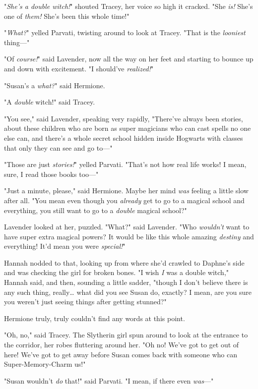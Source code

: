 "\emph{She's a double witch!}" shouted Tracey, her voice so high it cracked. 
"She\emph{ is!} She's one of \emph{them!} She's been this whole time!"

"\emph{What?}" yelled Parvati, twisting around to look at Tracey. "That is the 
\emph{looniest} thing---"

"Of \emph{course!}" said Lavender, now all the way on her feet and starting to 
bounce up and down with excitement. "I should've\emph{ realized!}"

"Susan's a \emph{what?}" said Hermione.

"A \emph{double} witch!" said Tracey.

"You see," said Lavender, speaking very rapidly, "There've always been stories, 
about these children who are born as super magicians who can cast spells no one 
else can, and there's a whole secret school hidden inside Hogwarts with classes 
that only they can see and go to---"

"Those are just \emph{stories!}" yelled Parvati. "That's not how real life 
works! I mean, sure, I read those books too---"

"Just a minute, please," said Hermione. Maybe her mind \emph{was} feeling a 
little slow after all. "You mean even though you \emph{already} get to go to a 
magical school and everything, you still want to go to a \emph{double} magical 
school?"

Lavender looked at her, puzzled. "What?" said Lavender. "Who \emph{wouldn't} 
want to have super extra magical powers? It would be like this whole amazing 
\emph{destiny} and everything! It'd mean you were \emph{special!}"

Hannah nodded to that, looking up from where she'd crawled to Daphne's side and 
was checking the girl for broken bones. "I wish \emph{I} was a double witch," 
Hannah said, and then, sounding a little sadder, "though I don't believe there 
is any such thing, really{\ldots} what did you see Susan do, exactly? I mean, 
are you sure you weren't just seeing things after getting stunned?"

Hermione truly, truly couldn't find any words at this point.

"Oh, no," said Tracey. The Slytherin girl spun around to look at the entrance 
to the corridor, her robes fluttering around her. "Oh no! We've got to get out 
of here! We've got to get away before Susan comes back with someone who can 
Super-Memory-Charm us!"

"Susan wouldn't \emph{do} that!" said Parvati. "I mean, if there even 
\emph{was}---"

